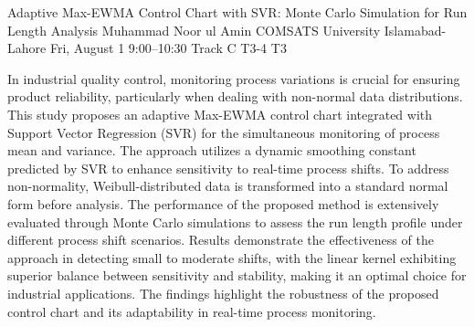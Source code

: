 \begin{talk}
  {Adaptive Max-EWMA Control Chart with SVR: Monte Carlo Simulation for Run Length Analysis}%
  {Muhammad Noor ul Amin}%
  {COMSATS University Islamabad-Lahore}%
  {}%
  {}%
  {}%
  {Fri, August 1 9:00–10:30 Track C}%
  {T3-4}%
  {T3}%
			
In industrial quality control, monitoring process variations is crucial for ensuring product
reliability, particularly when dealing with non-normal data distributions. This study proposes an
adaptive Max-EWMA control chart integrated with Support Vector Regression (SVR) for the
simultaneous monitoring of process mean and variance. The approach utilizes a dynamic
smoothing constant predicted by SVR to enhance sensitivity to real-time process shifts. To
address non-normality, Weibull-distributed data is transformed into a standard normal form
before analysis. The performance of the proposed method is extensively evaluated through
Monte Carlo simulations to assess the run length profile under different process shift scenarios.
Results demonstrate the effectiveness of the approach in detecting small to moderate shifts, with
the linear kernel exhibiting superior balance between sensitivity and stability, making it an
optimal choice for industrial applications. The findings highlight the robustness of the proposed
control chart and its adaptability in real-time process monitoring.
\medskip

\end{talk}
